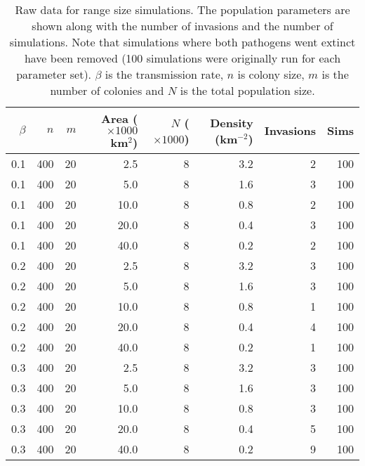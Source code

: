 \begin{table}[ht]
\centering
\caption[
Raw data for range size simulations
  ]{
Raw data for range size simulations.
The population parameters are shown along with the number of invasions and the number of simulations.
Note that simulations where both pathogens went extinct have been removed (100 simulations were originally run for each parameter set).
$\beta$ is the transmission rate, $n$ is colony size, $m$ is the number of colonies and $N$ is the total population size.
} 
\label{C-pop}
\begingroup\small
\begin{tabular}{@{}rrrrrrrr@{}}
  \toprule
$\beta$ & $n$ & $m$ & Area \tiny{($\times 1000$ km$^2$)} & $N$ \tiny{($\times 1000$)} & Density \tiny{(km$^{-2}$)} & Invasions & Sims \\ 
  \midrule
0.1 & 400 & 20 & 2.5 & 8 & 3.2 & 2 & 100 \\ 
  0.1 & 400 & 20 & 5.0 & 8 & 1.6 & 3 & 100 \\ 
  0.1 & 400 & 20 & 10.0 & 8 & 0.8 & 2 & 100 \\ 
  0.1 & 400 & 20 & 20.0 & 8 & 0.4 & 3 & 100 \\ 
  0.1 & 400 & 20 & 40.0 & 8 & 0.2 & 2 & 100 \\ 
  0.2 & 400 & 20 & 2.5 & 8 & 3.2 & 3 & 100 \\ 
  0.2 & 400 & 20 & 5.0 & 8 & 1.6 & 3 & 100 \\ 
  0.2 & 400 & 20 & 10.0 & 8 & 0.8 & 1 & 100 \\ 
  0.2 & 400 & 20 & 20.0 & 8 & 0.4 & 4 & 100 \\ 
  0.2 & 400 & 20 & 40.0 & 8 & 0.2 & 1 & 100 \\ 
  0.3 & 400 & 20 & 2.5 & 8 & 3.2 & 3 & 100 \\ 
  0.3 & 400 & 20 & 5.0 & 8 & 1.6 & 3 & 100 \\ 
  0.3 & 400 & 20 & 10.0 & 8 & 0.8 & 3 & 100 \\ 
  0.3 & 400 & 20 & 20.0 & 8 & 0.4 & 5 & 100 \\ 
  0.3 & 400 & 20 & 40.0 & 8 & 0.2 & 9 & 100 \\ 
   \bottomrule
\end{tabular}
\endgroup
\end{table}



